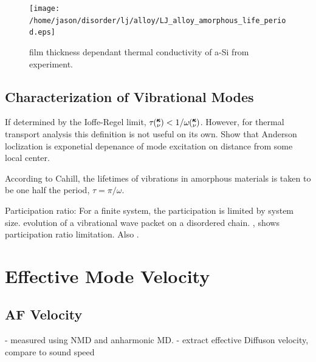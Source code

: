 \documentclass[aps,prb,preprint,superscriptaddress,amsmath,amssymb,floatfix]{revtex4}
\newcommand{\kv}{\mspace{-4.0mu}\left(\mspace{-8.0mu}
\begin{smallmatrix}&\pmb{\kappa} \\&\nu\end{smallmatrix}
\mspace{-3.0mu}\right)}
\begin{document}
\begin{figure}
\begin{center}
\texttt{[image: /home/jason/disorder/lj/alloy/LJ\_alloy\_amorphous\_life\_period.eps]}
\vspace*{-5mm}
\end{center}
\caption{\label{FIG:phonon_diff} film thickness dependant thermal 
conductivity of a-Si from experiment.}
\end{figure}

\vspace*{100mm}

\subsection{\label{S:Lifetimes:}Characterization of Vibrational Modes}
If determined by the Ioffe-Regel limit, $\tau \kv < 1/\omega \kv$.
\cite{taraskin_determination_1999} However, for thermal transport 
analysis this definition is not useful on its own. Show that Anderson 
loclization is exponetial depenance of mode excitation on distance from 
some local center\cite{feldman_numerical_1999}.

According to Cahill, the lifetimes of vibrations in amorphous materials 
is taken to be one half the period, $\tau = \pi/\omega $.
\cite{cahill_heat_1989}

Participation ratio:
For a finite system, the participation is limited by system size.
evolution of a vibrational wave packet on a disordered chain.
\cite{allen_evolution_1998}, shows participation ratio limitation. Also 
\cite{garber_numerical_2001}.

\section{\label{S:GroupVeloctiy}Effective Mode Velocity}

\subsection{\label{S-Motivation-Amorphous}AF Velocity}
- measured using NMD and anharmonic MD.
- extract effective Diffuson velocity, compare to sound speed
\end{document}
